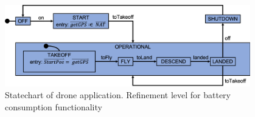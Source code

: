 \begin{figure}[!h]
	\centering
	\includegraphics[width=0.95\textwidth]{figures/Picture2.png}
	\caption{Statechart of drone application. Refinement level for battery consumption functionality}
	\label{fig:drone4}
\end{figure} 
